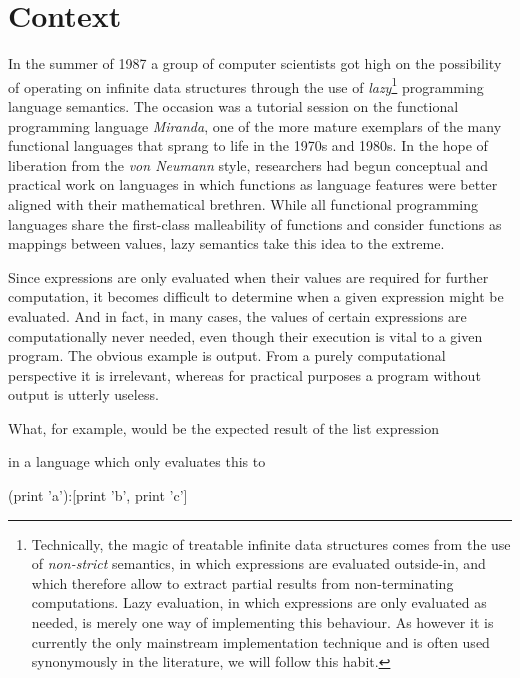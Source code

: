 \chapter{Context}

In the summer of 1987 a group of computer scientists got high on the
possibility of operating on infinite data structures through the use of
\emph{lazy}\footnote{Technically, the magic of treatable infinite data
structures comes from the use of \emph{non-strict} semantics, in which
expressions are evaluated outside-in, and which therefore allow to extract
partial results from non-terminating computations. Lazy evaluation, in which
expressions are only evaluated as needed, is merely one way of implementing
this behaviour. As however it is currently the only mainstream implementation
technique and is often used synonymously in the literature, we will follow this
habit.} programming language semantics\smartcite[p. 12-3]{hask-history}. The
occasion was a tutorial session on the functional programming language
\emph{Miranda}, one of the more mature exemplars of the many functional
languages that sprang to life in the 1970s and 1980s. In the hope of liberation
from the \emph{von Neumann} style\smartcite{backus}, researchers had begun
conceptual and practical work on languages in which functions as language
features were better aligned with their mathematical brethren. While all
functional programming languages share the first-class malleability of
functions and consider functions as mappings between values, lazy semantics
take this idea to the extreme.

Since expressions are only evaluated when their values are required for
further computation, it becomes difficult to determine when a given
expression might be evaluated. And in fact, in many cases, the values of
certain expressions are computationally never needed, even though their
execution is vital to a given program. The obvious example is output.
From a purely computational perspective it is irrelevant, whereas for
practical purposes a program without output is utterly useless.

What, for example, would be the expected result of the list expression

\begin{code}
\end{code}

in a language which only evaluates this to

\begin{code}
  (print 'a'):[print 'b', print 'c']
\end{code}

